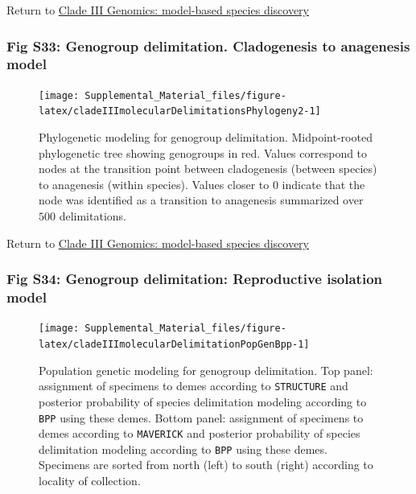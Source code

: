 \documentclass[
  11pt,
]{article}
\begin{document}
Return to \protect\hyperlink{model-based-species-discovery-5}{Clade III Genomics: model-based species discovery}
\pagebreak

\hypertarget{fig-s33-genogroup-delimitation.-cladogenesis-to-anagenesis-model}{%
\subsubsection{Fig S33: Genogroup delimitation. Cladogenesis to anagenesis model}\label{fig-s33-genogroup-delimitation.-cladogenesis-to-anagenesis-model}}

\begin{figure}
\texttt{[image: Supplemental\_Material\_files/figure-latex/cladeIIImolecularDelimitationsPhylogeny2-1]} \caption{Phylogenetic modeling for genogroup delimitation. Midpoint-rooted phylogenetic tree showing genogroups in red. Values correspond to nodes at the transition point between cladogenesis (between species) to anagenesis (within species). Values closer to 0 indicate that the node was identified as a transition to anagenesis summarized over $500$ delimitations.}\label{fig:cladeIIImolecularDelimitationsPhylogeny2}
\end{figure}

Return to \protect\hyperlink{model-based-species-discovery-5}{Clade III Genomics: model-based species discovery}
\pagebreak

\hypertarget{fig-s34-genogroup-delimitation-reproductive-isolation-model}{%
\subsubsection{Fig S34: Genogroup delimitation: Reproductive isolation model}\label{fig-s34-genogroup-delimitation-reproductive-isolation-model}}

\begin{figure}
\texttt{[image: Supplemental\_Material\_files/figure-latex/cladeIIImolecularDelimitationPopGenBpp-1]} \caption{Population genetic modeling for genogroup delimitation. Top panel: assignment of specimens to demes according to \texttt{STRUCTURE} and posterior probability of species delimitation modeling according to \texttt{BPP} using these demes. Bottom panel: assignment of specimens to demes according to \texttt{MAVERICK} and posterior probability of species delimitation modeling according to \texttt{BPP} using these demes. Specimens are sorted from north (left) to south (right) according to locality of collection.}\label{fig:cladeIIImolecularDelimitationPopGenBpp}
\end{figure}
\end{document}
